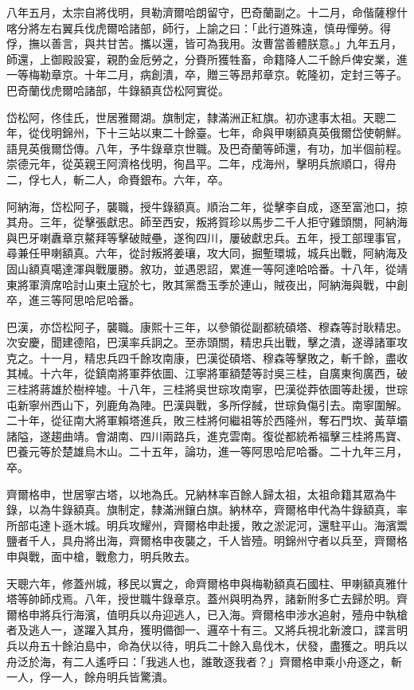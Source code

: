 \begin{pinyinscope}
八年五月，太宗自將伐明，貝勒濟爾哈朗留守，巴奇蘭副之。十二月，命偕薩穆什喀分將左右翼兵伐虎爾哈諸部，師行，上諭之曰：「此行道殊遠，慎毋憚勞。得俘，撫以善言，與共甘苦。攜以還，皆可為我用。汝曹當善體朕意。」九年五月，師還，上御殿設宴，親酌金卮勞之，分賚所獲牲畜，命籍降人二千餘戶俾安業，進一等梅勒章京。十年二月，病創潰，卒，贈三等昂邦章京。乾隆初，定封三等子。巴奇蘭伐虎爾哈諸部，牛錄額真岱松阿實從。

岱松阿，佟佳氏，世居雅爾湖。旗制定，隸滿洲正紅旗。初亦逮事太祖。天聰二年，從伐明錦州，下十三站以東二十餘臺。七年，命與甲喇額真英俄爾岱使朝鮮。語見英俄爾岱傳。八年，予牛錄章京世職。及巴奇蘭等師還，有功，加半個前程。崇德元年，從英親王阿濟格伐明，徇昌平。二年，戍海州，擊明兵旅順口，得舟二，俘七人，斬二人，命賚銀布。六年，卒。

阿納海，岱松阿子，襲職，授牛錄額真。順治二年，從擊李自成，逐至富池口，掠其舟。三年，從擊張獻忠。師至西安，叛將賀珍以馬步二千人拒守雞頭關，阿納海與巴牙喇纛章京鰲拜等擊破賊壘，遂徇四川，屢破獻忠兵。五年，授工部理事官，尋兼任甲喇額真。六年，從討叛將姜瓖，攻大同，掘塹環城，城兵出戰，阿納海及固山額真噶達渾與戰屢勝。敘功，並遇恩詔，累進一等阿達哈哈番。十八年，從靖東將軍濟席哈討山東土寇於七，敗其黨喬玉季於連山，賊夜出，阿納海與戰，中創卒，進三等阿思哈尼哈番。

巴漢，亦岱松阿子，襲職。康熙十三年，以參領從副都統碩塔、穆森等討耿精忠。次安慶，聞建德陷，巴漢率兵詗之。至赤頭關，精忠兵出戰，擊之潰，遂導諸軍攻克之。十一月，精忠兵四千餘攻南康，巴漢從碩塔、穆森等擊敗之，斬千餘，盡收其械。十六年，從鎮南將軍莽依圖、江寧將軍額楚等討吳三桂，自廣東徇廣西，破三桂將蔣雄於樹梓墟。十八年，三桂將吳世琮攻南寧，巴漢從莽依圖等赴援，世琮屯新寧州西山下，列鹿角為陣。巴漢與戰，多所俘馘，世琮負傷引去。南寧圍解。二十年，從征南大將軍賴塔進兵，敗三桂將何繼祖等於西隆州，奪石門坎、黃草壩諸隘，遂趨曲靖。會湖南、四川兩路兵，進克雲南。復從都統希福擊三桂將馬寶、巴養元等於楚雄烏木山。二十五年，論功，進一等阿思哈尼哈番。二十九年三月，卒。

齊爾格申，世居寧古塔，以地為氏。兄納林率百餘人歸太祖，太祖命籍其眾為牛錄，以為牛錄額真。旗制定，隸滿洲鑲白旗。納林卒，齊爾格申代為牛錄額真，率所部屯達卜遜木城。明兵攻耀州，齊爾格申赴援，敗之淤泥河，還駐平山。海濱鬻鹽者千人，具舟將出海，齊爾格申夜襲之，千人皆殪。明錦州守者以兵至，齊爾格申與戰，面中槍，戰愈力，明兵敗去。

天聰六年，修蓋州城，移民以實之，命齊爾格申與梅勒額真石國柱、甲喇額真雅什塔等帥師戍焉。八年，授世職牛錄章京。蓋州與明為界，諸新附多亡去歸於明。齊爾格申將兵行海濱，值明兵以舟迎逃人，已入海。齊爾格申涉水追射，殪舟中執槍者及逃人一，遂躍入其舟，獲明備御一、邏卒十有三。又將兵視北新渡口，諜言明兵以舟五十餘泊島中，命為伏以待，明兵二十餘入島伐木，伏發，盡獲之。明兵以舟泛於海，有二人遙呼曰：「我逃人也，誰敢逐我者？」齊爾格申乘小舟逐之，斬一人，俘一人，餘舟明兵皆驚潰。


\end{pinyinscope}
